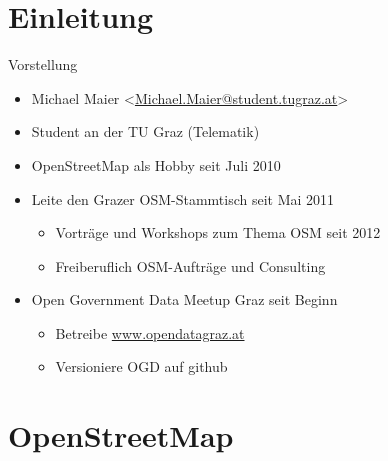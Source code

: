 \documentclass{beamer}
\begin{document}
\section{Einleitung}

\begin{frame}{Vorstellung}

  \begin{itemize}
    \item Michael Maier \textless \href{mailto:Michael.Maier@student.tugraz.at}{Michael.Maier@student.tugraz.at}\textgreater
    \item Student an der TU Graz (Telematik)
\vspace{0.3cm}
    \item OpenStreetMap als Hobby seit Juli 2010
    \item Leite den Grazer OSM-Stammtisch seit Mai 2011
    \begin{itemize}
        \item Vorträge und Workshops zum Thema OSM seit 2012
        \item Freiberuflich OSM-Aufträge und Consulting
    \end{itemize}
\vspace{0.3cm}
    \item Open Government Data Meetup Graz seit Beginn
    \begin{itemize}
        \item Betreibe \href{http://opendatagraz.at}{www.opendatagraz.at}
        \item Versioniere OGD auf github
    \end{itemize}
  \end{itemize}
\end{frame}




\section{OpenStreetMap}
\end{document}
